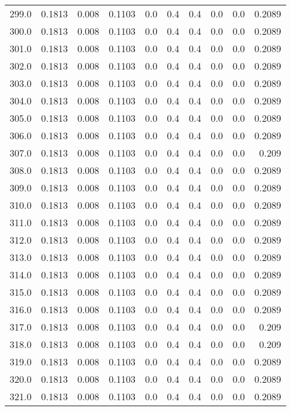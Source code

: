 \begin{longtable}{lrrrrrrrrr}
299.0 & 0.1813 & 0.008 & 0.1103 & 0.0 & 0.4 & 0.4 & 0.0 & 0.0 & 0.2089 \\
300.0 & 0.1813 & 0.008 & 0.1103 & 0.0 & 0.4 & 0.4 & 0.0 & 0.0 & 0.2089 \\
301.0 & 0.1813 & 0.008 & 0.1103 & 0.0 & 0.4 & 0.4 & 0.0 & 0.0 & 0.2089 \\
302.0 & 0.1813 & 0.008 & 0.1103 & 0.0 & 0.4 & 0.4 & 0.0 & 0.0 & 0.2089 \\
303.0 & 0.1813 & 0.008 & 0.1103 & 0.0 & 0.4 & 0.4 & 0.0 & 0.0 & 0.2089 \\
304.0 & 0.1813 & 0.008 & 0.1103 & 0.0 & 0.4 & 0.4 & 0.0 & 0.0 & 0.2089 \\
305.0 & 0.1813 & 0.008 & 0.1103 & 0.0 & 0.4 & 0.4 & 0.0 & 0.0 & 0.2089 \\
306.0 & 0.1813 & 0.008 & 0.1103 & 0.0 & 0.4 & 0.4 & 0.0 & 0.0 & 0.2089 \\
307.0 & 0.1813 & 0.008 & 0.1103 & 0.0 & 0.4 & 0.4 & 0.0 & 0.0 & 0.209 \\
308.0 & 0.1813 & 0.008 & 0.1103 & 0.0 & 0.4 & 0.4 & 0.0 & 0.0 & 0.2089 \\
309.0 & 0.1813 & 0.008 & 0.1103 & 0.0 & 0.4 & 0.4 & 0.0 & 0.0 & 0.2089 \\
310.0 & 0.1813 & 0.008 & 0.1103 & 0.0 & 0.4 & 0.4 & 0.0 & 0.0 & 0.2089 \\
311.0 & 0.1813 & 0.008 & 0.1103 & 0.0 & 0.4 & 0.4 & 0.0 & 0.0 & 0.2089 \\
312.0 & 0.1813 & 0.008 & 0.1103 & 0.0 & 0.4 & 0.4 & 0.0 & 0.0 & 0.2089 \\
313.0 & 0.1813 & 0.008 & 0.1103 & 0.0 & 0.4 & 0.4 & 0.0 & 0.0 & 0.2089 \\
314.0 & 0.1813 & 0.008 & 0.1103 & 0.0 & 0.4 & 0.4 & 0.0 & 0.0 & 0.2089 \\
315.0 & 0.1813 & 0.008 & 0.1103 & 0.0 & 0.4 & 0.4 & 0.0 & 0.0 & 0.2089 \\
316.0 & 0.1813 & 0.008 & 0.1103 & 0.0 & 0.4 & 0.4 & 0.0 & 0.0 & 0.2089 \\
317.0 & 0.1813 & 0.008 & 0.1103 & 0.0 & 0.4 & 0.4 & 0.0 & 0.0 & 0.209 \\
318.0 & 0.1813 & 0.008 & 0.1103 & 0.0 & 0.4 & 0.4 & 0.0 & 0.0 & 0.209 \\
319.0 & 0.1813 & 0.008 & 0.1103 & 0.0 & 0.4 & 0.4 & 0.0 & 0.0 & 0.2089 \\
320.0 & 0.1813 & 0.008 & 0.1103 & 0.0 & 0.4 & 0.4 & 0.0 & 0.0 & 0.2089 \\
321.0 & 0.1813 & 0.008 & 0.1103 & 0.0 & 0.4 & 0.4 & 0.0 & 0.0 & 0.2089 \\

\end{longtable}
